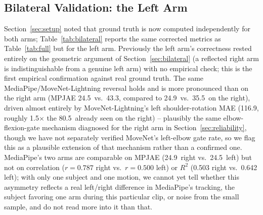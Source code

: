 \documentclass[conference]{IEEEtran}
\begin{document}
\subsection{Bilateral Validation: the Left Arm}
\label{sec:bilateral-results}
Section~\ref{sec:setup} noted that ground truth is now computed
independently for both arms; Table~\ref{tab:bilateral} reports the same
corrected metrics as Table~\ref{tab:full} but for the left arm.
Previously the left arm's correctness rested entirely on the geometric
argument of Section~\ref{sec:bilateral} (a reflected right arm is
indistinguishable from a genuine left arm) with no empirical check; this
is the first empirical confirmation against real ground truth. The
same MediaPipe/MoveNet-Lightning reversal holds and is more pronounced
than on the right arm (MPJAE 24.5\textdegree\ vs.\ 43.3\textdegree,
compared to 24.9\textdegree\ vs.\ 35.5\textdegree\ on the right), driven
almost entirely by MoveNet-Lightning's left shoulder-rotation MAE
(116.9\textdegree, roughly 1.5$\times$ the 80.5\textdegree\ already seen
on the right) -- plausibly the same elbow-flexion-gate mechanism
diagnosed for the right arm in Section~\ref{sec:reliability}, though we
have not separately verified MoveNet's left-elbow gate rate, so we flag
this as a plausible extension of that mechanism rather than a confirmed
one. MediaPipe's
two arms are comparable on MPJAE (24.9\textdegree\ right vs.\
24.5\textdegree\ left) but not on correlation ($r=0.787$ right vs.\
$r=0.500$ left) or $R^2$ (0.503 right vs.\ 0.642 left); with only one
subject and one motion, we cannot yet tell whether this asymmetry
reflects a real left/right difference in MediaPipe's tracking, the
subject favoring one arm during this particular clip, or noise from the
small sample, and do not read more into it than that.
\end{document}
